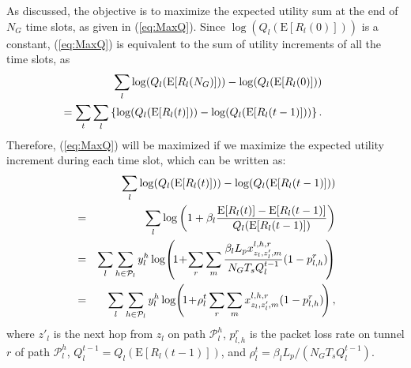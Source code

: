 \documentclass[12pt,onecolumn,draftclsnofoot]{IEEEtran} %
\begin{document}
As discussed, the objective is to maximize the expected utility sum at the end of $N_G$ time slots, as given in (\ref{eq:MaxQ}).  Since $\log(Q_l(\mbox{E}[R_l(0)]))$ is a constant, (\ref{eq:MaxQ}) is equivalent to the sum of utility increments of all the time slots, as 
\begin{eqnarray}\label{eq:ObjFunPrf12}
  && \hspace{-0.3in} \sum_l \log(Q_l(\mbox{E}[R_l(N_G)])) - \log(Q_l(\mbox{E}[R_l(0)])) \nonumber \\
  && \hspace{-0.45in} = \sum_t \sum_l \left\{ \log(Q_l(\mbox{E}[R_l(t)])) - \log(Q_l(\mbox{E}[R_l(t-1)])) \right\}. 
\end{eqnarray}
Therefore, (\ref{eq:MaxQ}) will be maximized if we maximize the expected utility increment during each time slot, which can be written as:
\begin{eqnarray} \label{eq:objrewritten}
	 & & \hspace{-0.1in} \sum_l \log(Q_l(\mbox{E}[R_l(t)])) -
	    \log(Q_l(\mbox{E}[R_l(t-1)])) 
	 \nonumber \\
	 &=& 
	 \sum_l \log \left( 1 +  \beta_l \frac{ \mbox{E}[R_l(t)] - \mbox{E}[R_l(t-1)] }{ Q_l(\mbox{E}[R_l(t-1)])} \right) \nonumber \\
	 &=&  
	 \sum_l\sum_{h \in \mathcal{P}_l} y_l^h \log \hspace{-0.025in} \left( \hspace{-0.025in} 1 \hspace{-0.025in} + \hspace{-0.025in} \sum_r \sum_m \frac{\beta_l L_p x_{z_l, z'_l, m}^{l,h,r}}{N_G T_s Q_l^{t-1}} (1-p_{l,h}^r) \hspace{-0.025in} \right) 
	 \nonumber \\
	 &=& 
	 \sum_l\sum_{h \in \mathcal{P}_l}y_l^h \log \hspace{-0.025in} \left( \hspace{-0.025in} 1 \hspace{-0.025in} + \hspace{-0.025in} \rho_l^t \sum_r \sum_m x_{z_l,z'_l,m}^{l,h,r} (1-p_{l,h}^r) \hspace{-0.025in} \right), \nonumber 
\end{eqnarray}
where $z'_l$ is the next hop from $z_l$ on path $\mathcal{P}_l^h$, $p_{l,h}^r$ is the packet loss rate on tunnel $r$ of path $\mathcal{P}_l^h$, $Q_l^{t-1} = Q_l(\mbox{E}[R_l(t-1)])$, and $\rho_l^t = \beta_l L_p / (N_G T_s Q_l^{t-1})$. 
\end{document}
